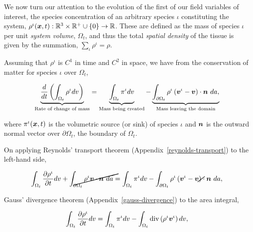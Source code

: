 We now turn our attention to the evolution of the first of our field
variables of interest, the species concentration of an arbitrary
species $\iota$ constituting the system, $\rho^{\iota}(\mbox{\boldmath$ x$},t):
\mathbb{R}^3\times\mathbb{R}^{+}\cup\{0\} \rightarrow
\mathbb{R}$. These are defined as the mass of species $\iota$ per unit
{\em system volume}, $\Omega_{t}$, and thus the total {\em spatial
  density} of the tissue is given by the summation,
$\sum\limits_{\iota}\rho^\iota = \rho$. 

Assuming that $\rho^{\iota}$ is $\mathit{C}^{1}$ in time and
$\mathit{C}^{2}$ in space, we have from the conservation of matter for
species $\iota$ over $\Omega_{t}$,

\begin{equation}
\underbrace{\frac{d}{dt}\left(\int_{\Omega_{t}} \rho^{\iota} dv
  \right)}_{\text{Rate of change of mass}} = 
 \underbrace{\int_{\Omega_{t}}
  \pi^{\iota} dv}_{\text{Mass being created}}
- \underbrace{\int_{\partial \Omega_{t}} \rho^{\iota}
  \left(\bv^{\iota} - \bv\right) \cdot \bn\ 
da,}_{\text{Mass leaving the domain}}
\label{eu-globalbalanceofmass}
\end{equation}

\noindent where $\pi^{\iota}(\mbox{\boldmath$ x$},t)$ is the volumetric source (or
sink) of species $\iota$ and $\mbox{\boldmath$ n$}$ is the outward normal vector over
$\partial \Omega_{t}$, the boundary of $\Omega_{t}$. %

On applying Reynolds' transport theorem
(Appendix~\ref{reynolds-transport}) to the left-hand side,

\begin{equation*}
\int_{\Omega_{t}} \frac{\partial \rho^{\iota}}{\partial t} dv
+ \cancel{\int_{\partial \Omega_{t}} \rho^{\iota} \bv \cdot \bn\ da} =
\int_{\Omega_{t}} \pi^{\iota} dv
- \int_{\partial \Omega_{t}} \rho^{\iota} \left(\bv^{\iota} -
\cancel{\bv}\right) \cdot \bn\ da,
\end{equation*}

\noindent Gauss' divergence theorem (Appendix~\ref{gauss-divergence})
to the area integral,

\begin{equation*}
\int_{\Omega_{t}} \frac{\partial \rho^{\iota}}{\partial t} dv =
\int_{\Omega_{t}} \pi^{\iota} dv
- \int_{\Omega_{t}} \mathrm{div} \left( \rho^{\iota} \mbox{\boldmath$ v$}^{\iota}\right) dv, 
\end{equation*}

